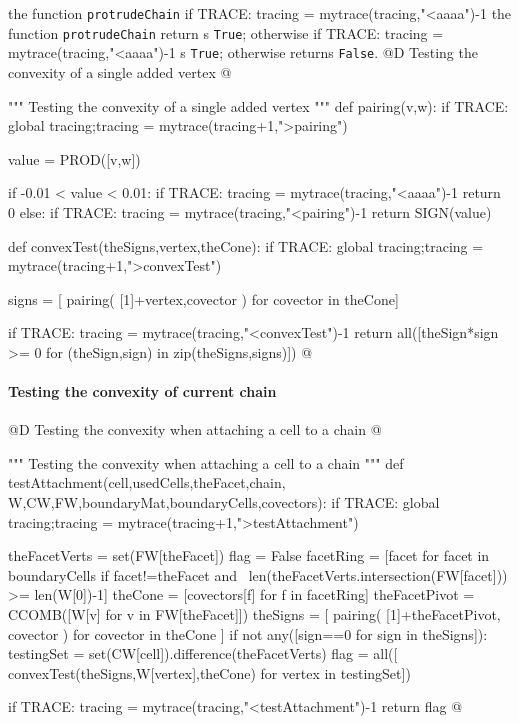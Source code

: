 \documentclass[11pt,oneside]{article}	%
\begin{document}
the function \texttt{protrudeChain} if TRACE: tracing = mytrace(tracing,"<aaaa")-1
the function \texttt{protrudeChain} return
s \texttt{True}; otherwise if TRACE: tracing = mytrace(tracing,"<aaaa")-1
s \texttt{True}; otherwise returns \texttt{False}. 
@D Testing the convexity of a single added vertex
@{""" Testing the convexity of a single added vertex """
def pairing(v,w):
	if TRACE: global tracing;tracing = mytrace(tracing+1,">pairing")

	value = PROD([v,w])

	if -0.01 < value < 0.01: 
		if TRACE: tracing = mytrace(tracing,"<aaaa")-1
		return 0
	else: 
		if TRACE: tracing = mytrace(tracing,"<pairing")-1
		return SIGN(value)

def convexTest(theSigns,vertex,theCone):
	if TRACE: global tracing;tracing = mytrace(tracing+1,">convexTest")

	signs = [ pairing( [1]+vertex,covector ) for covector in theCone]

	if TRACE: tracing = mytrace(tracing,"<convexTest")-1
	return all([theSign*sign >= 0 for (theSign,sign) in zip(theSigns,signs)])
@}

\paragraph{Testing the convexity of current chain}
@D Testing the convexity when attaching a cell to a chain
@{""" Testing the convexity when attaching a cell to a chain """
def testAttachment(cell,usedCells,theFacet,chain,
					W,CW,FW,boundaryMat,boundaryCells,covectors):
	if TRACE: global tracing;tracing = mytrace(tracing+1,">testAttachment")
	
	theFacetVerts = set(FW[theFacet])
	flag = False
	facetRing = [facet for facet in boundaryCells if facet!=theFacet and \
				 len(theFacetVerts.intersection(FW[facet])) >= len(W[0])-1]
	theCone = [covectors[f] for f in facetRing]
	theFacetPivot = CCOMB([W[v] for v in FW[theFacet]])
	theSigns = [ pairing( [1]+theFacetPivot, covector ) for covector in theCone ]
	if not any([sign==0 for sign in theSigns]):
		testingSet = set(CW[cell]).difference(theFacetVerts)
		flag = all([ convexTest(theSigns,W[vertex],theCone) for vertex in testingSet])

	if TRACE: tracing = mytrace(tracing,"<testAttachment")-1
	return flag
@}
\end{document}

